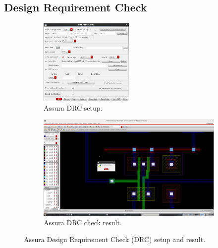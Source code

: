 \documentclass[11pt]{article}
\begin{document}
\subsection{Design Requirement Check}
\begin{figure}[!h]
    \begin{subfigure}[h]{\textwidth}
        \begin{center}
            \includegraphics[width=0.5\textwidth]{drc}
            \caption{Assura DRC setup.}
        \end{center}
    \end{subfigure}
    \begin{subfigure}[h]{\textwidth}
        \begin{center}
            \vspace{1in}
            \includegraphics[width=\textwidth]{drcResult}
            \caption{Assura DRC check result.}
        \end{center}
    \end{subfigure}
    \caption{Assura Design Requirement Check (DRC) setup and result.}
\end{figure}
\newpage
\end{document}
